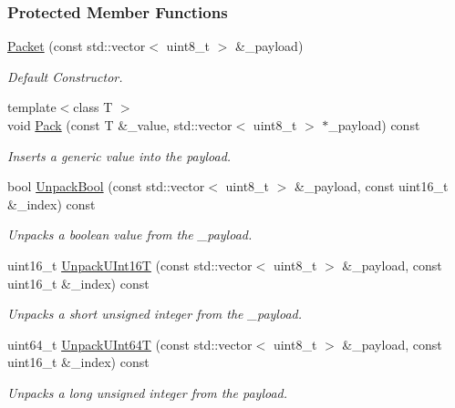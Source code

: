 \subsubsection*{Protected Member Functions}
\begin{DoxyCompactItemize}
\item 
\hyperlink{classosse_1_1collaborate_1_1_packet_a83e5d92a626c5adb0958c0faf7bbbf87}{Packet} (const std\+::vector$<$ uint8\+\_\+t $>$ \&\+\_\+payload)
\begin{DoxyCompactList}\small\item\em Default Constructor. \end{DoxyCompactList}\item 
{\footnotesize template$<$class T $>$ }\\void \hyperlink{classosse_1_1collaborate_1_1_packet_a7ebfc5903ba6bf302e2f4a33340e7155}{Pack} (const T \&\+\_\+value, std\+::vector$<$ uint8\+\_\+t $>$ $\ast$\+\_\+payload) const
\begin{DoxyCompactList}\small\item\em Inserts a generic value into the payload. \end{DoxyCompactList}\item 
bool \hyperlink{classosse_1_1collaborate_1_1_packet_acf78e5e563ba07643fb1969dc332b1fb}{Unpack\+Bool} (const std\+::vector$<$ uint8\+\_\+t $>$ \&\+\_\+payload, const uint16\+\_\+t \&\+\_\+index) const
\begin{DoxyCompactList}\small\item\em Unpacks a boolean value from the \+\_\+payload. \end{DoxyCompactList}\item 
uint16\+\_\+t \hyperlink{classosse_1_1collaborate_1_1_packet_a454166985d9b63b553cb6174417c4dde}{Unpack\+U\+Int16T} (const std\+::vector$<$ uint8\+\_\+t $>$ \&\+\_\+payload, const uint16\+\_\+t \&\+\_\+index) const
\begin{DoxyCompactList}\small\item\em Unpacks a short unsigned integer from the \+\_\+payload. \end{DoxyCompactList}\item 
uint64\+\_\+t \hyperlink{classosse_1_1collaborate_1_1_packet_ab84b122670543d85df644041129568df}{Unpack\+U\+Int64T} (const std\+::vector$<$ uint8\+\_\+t $>$ \&\+\_\+payload, const uint16\+\_\+t \&\+\_\+index) const
\begin{DoxyCompactList}\small\item\em Unpacks a long unsigned integer from the payload. \end{DoxyCompactList}\item 

\end{DoxyCompactItemize}
